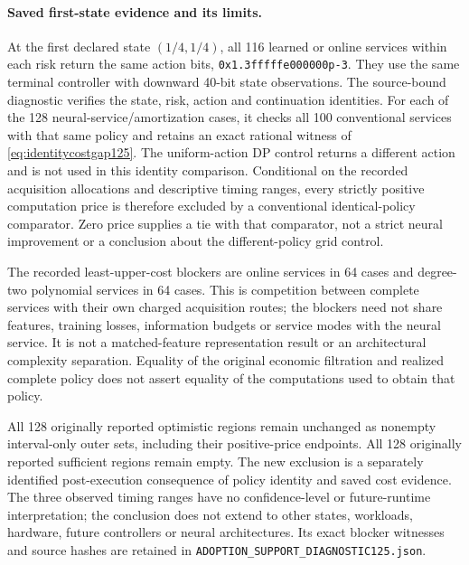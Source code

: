 \paragraph{Saved first-state evidence and its limits.}
At the first declared state $(1/4,1/4)$, all 116 learned or online
services within each risk return the same action bits,
\texttt{0x1.3fffffe000000p-3}. They use the same terminal controller
with downward 40-bit state observations. The source-bound diagnostic
verifies the state, risk, action and continuation identities. For each
of the 128 neural-service/amortization cases, it checks all 100
conventional services with that same policy and retains an exact
rational witness of \eqref{eq:identitycostgap125}. The uniform-action
DP control returns a different action and is not used in this identity
comparison. Conditional on the recorded acquisition allocations and
descriptive timing ranges, every strictly positive computation price is
therefore excluded by a conventional identical-policy comparator. Zero
price supplies a tie with that comparator, not a strict neural improvement
or a conclusion about the different-policy grid control.

The recorded least-upper-cost blockers are online services in 64 cases
and degree-two polynomial services in 64 cases. This is competition
between complete services with their own charged acquisition routes;
the blockers need not share features, training losses, information budgets
or service modes with the neural service. It is not a matched-feature
representation result or an architectural complexity separation. Equality
of the original economic filtration and realized complete policy does not
assert equality of the computations used to obtain that policy.

All 128 originally reported optimistic regions remain unchanged as
nonempty interval-only outer sets, including their positive-price
endpoints. All 128 originally reported sufficient regions remain empty.
The new exclusion is a separately identified post-execution consequence
of policy identity and saved cost evidence. The three observed timing
ranges have no confidence-level or future-runtime interpretation; the
conclusion does not extend to other states, workloads, hardware, future
controllers or neural architectures. Its exact blocker witnesses and
source hashes are retained in
\texttt{ADOPTION\_SUPPORT\_DIAGNOSTIC125.json}.
